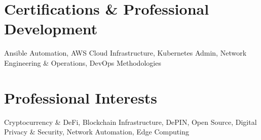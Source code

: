 \documentclass[11pt,a4paper]{article}
\begin{document}
\section*{Certifications \& Professional Development}
Ansible Automation, AWS Cloud Infrastructure, Kubernetes Admin, Network Engineering \& Operations, DevOps Methodologies

\section*{Professional Interests}
Cryptocurrency \& DeFi, Blockchain Infrastructure, DePIN, Open Source, Digital Privacy \& Security, Network Automation, Edge Computing
\end{document}
